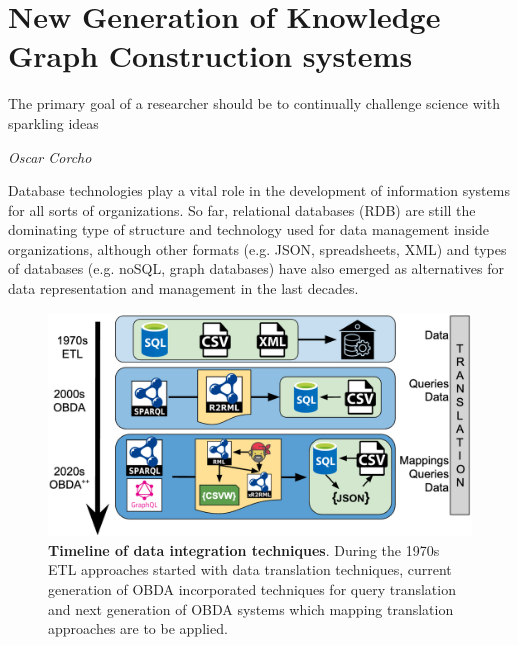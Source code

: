 
\chapter{New Generation of Knowledge Graph Construction systems}
\label{chapter:mappig-translation}

\epigraph{The primary goal of a researcher should be to continually challenge science with sparkling ideas}{\textit{Oscar Corcho}}


Database technologies play a vital role in the development of information systems for all sorts of organizations. So far, relational databases (RDB) are still the dominating type of structure and technology used for data management inside organizations, although other formats (e.g. JSON, spreadsheets, XML) and types of databases (e.g. noSQL, graph databases) have also emerged as alternatives for data representation and management in the last decades. 

\begin{figure}[!ht]
    \centering
    \includegraphics[width=1\columnwidth]{./figures/mt_obda_timeline.png}
    \caption[Timeline of data integration techniques]{\textbf{Timeline of data integration techniques}. During the 1970s ETL approaches started with data translation techniques, current generation of OBDA incorporated techniques for query translation and next generation of OBDA systems which mapping translation approaches are to be applied.%
    }
    \label{fig:obdatimeline}
\end{figure}

